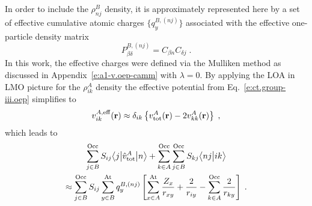 \documentclass[aip,jcp,amsmath,amssymb,reprint,floatfix]{revtex4-1}
\begin{document}
In order to include the $\rho^{B}_{nj}$ density, it is approximately represented here by a set of effective 
cumulative
atomic charges $\{ q^{B,(nj)}_{y} \}$ associated with the effective one\hyp{}particle density matrix
%
\begin{equation} \label{e:oed-group-iii}
 P^{B,(nj)}_{\beta\delta} = C_{\beta n} C_{\delta j} \;.
\end{equation}
%
In this work, the effective charges were defined via the Mulliken method as
discussed in Appendix~\ref{e:a1-v.oep-camm} with $\lambda=0$. 
By applying the LOA in LMO picture for the $\rho_{ik}^A$ density
the effective potential from Eq.~\eqref{e:ct.group-iii.oep} 
simplifies to
%
\begin{equation} \label{e:ct.group-iii.oep.simplified}
 {v}^{A,{\rm eff}}_{ik}({\bf r}) \approx
 \delta_{ik} \left\{
 {v}^A_{\rm tot} ({\bf r})- 2{v}^A_{kk} ({\bf r}) \right\} \;,
\end{equation}
%
which
leads to 
%
\begin{multline} \label{e:ct.group-iii.final.b}
         \sum_{j\in B}^{\rm Occ} S_{ij} \bigl\langle {j} \bigl\lvert {\hat{v}^A_{\rm tot} } \bigl\lvert {n} \bigr\rangle  
     + \sum_{k\in A}^{\rm Occ} \sum_{j\in B}^{\rm Occ}  
        S_{kj}
        \bigl\langle {nj} \bigl\lvert {ik} \bigr\rangle  \\
 \approx  
 \sum_{j\in B}^{\rm Occ} S_{ij}
 \sum_{y\in B}^{\rm At} 
 q^{B,(nj)}_{y} 
 \left[ 
   \sum_{x\in A}^{\rm At}
   \frac{Z_x}{r_{xy}}
  + \frac{2}{r_{iy}}
  - \sum_{k\in A}^{\rm Occ}
    \frac{2}{r_{ky}} 
 \right]
 \;.
\end{multline}
%
\end{document}
